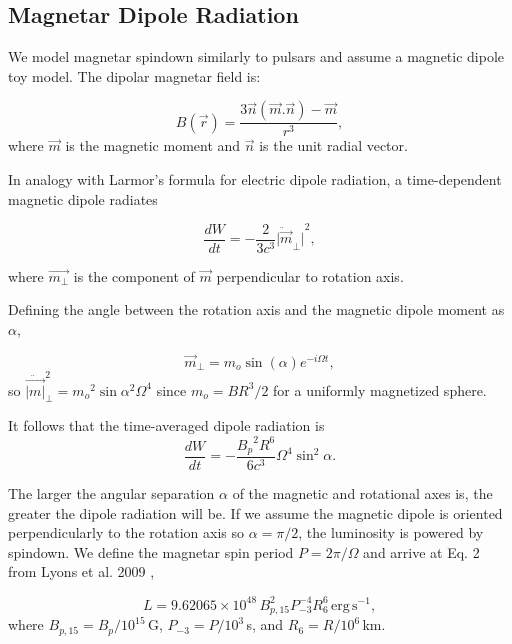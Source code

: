 \documentclass{article}
\begin{document}
\subsection{Magnetar Dipole Radiation} \label{sec:dipole}

We model magnetar spindown similarly to pulsars and assume a magnetic dipole toy model. The dipolar magnetar field is:

\begin{equation} B(\vec{r})=\frac{3\vec{n}(\vec{m}.\vec{n})-\vec{m}}{r^3}, \end{equation}
where $\vec{m}$ is the magnetic moment and $\vec{n}$ is the unit radial vector.

In analogy with Larmor's formula for electric dipole radiation, a time-dependent magnetic dipole radiates

\begin{equation}
\frac{dW}{dt} = -\frac{2}{3c^3} {\ddot{|\vec{m}}_\perp|}^2,
\end{equation}

where $\vec{m_\perp}$ is the component of $\vec{m}$ perpendicular to rotation axis.

Defining the angle between the rotation axis and the magnetic dipole moment as $\alpha$,

\begin{equation}\vec{m}_\perp = m_o  \sin({\alpha}) e^{-i\Omega t},\end{equation}
so $\ddot{\vec{|m|}}_\perp^2 = {m_o}^2 \sin{\alpha}^2 \Omega^4$
since $m_o = B R^3/2$ for a uniformly magnetized sphere.

It follows that the time-averaged dipole radiation is \begin{equation} \label{eq:lumin}\frac{dW}{dt} = -\frac{{B_p}^2 R^6}{6c^3} \Omega^4 \sin^2{\alpha}.\end{equation}

The larger the angular separation $\alpha$ of the magnetic and rotational axes is, the greater the dipole radiation will be. If we assume the magnetic dipole is oriented perpendicularly to the rotation axis so $\alpha=\pi/2$, the luminosity is powered by spindown. We define the magnetar spin period $P= 2\pi/\Omega$ and arrive at Eq. 2 from Lyons et al. 2009 \cite{Lyons:2009ka},

\begin{equation} \label{eq:lum} L  = 9.62065 \times 10^{48}\, B^2_{p,15} P^{-4}_{-3} R^6_6\,\mathrm{erg \,s^{-1}},\end{equation}
where $B_{p,15} = B_p/10^{15}$\,G, $P_{-3}=P/10^3$\,s, and $R_6=R/10^6$\,km.
\end{document}
